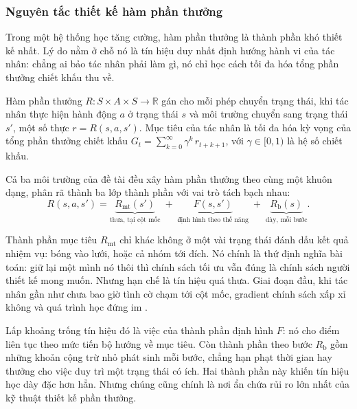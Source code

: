 \subsubsection{Nguyên tắc thiết kế hàm phần thưởng}
\label{sub:reward-principle}
\indent Trong một hệ thống học tăng cường, hàm phần thưởng là thành phần khó thiết kế
nhất. Lý do nằm ở chỗ nó là tín hiệu duy nhất định hướng hành vi của tác nhân: chẳng ai
bảo tác nhân phải làm gì, nó chỉ học cách tối đa hóa tổng phần thưởng chiết khấu thu về.

\begin{dn}
\label{dn:reward}
Hàm phần thưởng $R: S \times A \times S \to \mathbb{R}$ gán cho mỗi phép chuyển trạng
thái, khi tác nhân thực hiện hành động $a$ ở trạng thái $s$ và môi trường chuyển sang
trạng thái $s'$, một số thực $r = R(s, a, s')$. Mục tiêu của tác nhân là tối đa hóa kỳ
vọng của tổng phần thưởng chiết khấu $G_t = \sum_{k=0}^{\infty} \gamma^{k}\, r_{t+k+1}$,
với $\gamma \in [0,1)$ là hệ số chiết khấu.
\end{dn}

\indent Cả ba môi trường của đề tài đều xây hàm phần thưởng theo cùng một khuôn dạng, phân
rã thành ba lớp thành phần với vai trò tách bạch nhau:
\begin{equation}
R(s, a, s') = \underbrace{R_{\mathrm{mt}}(s')}_{\text{thưa, tại cột mốc}}
            \;+\; \underbrace{F(s, s')}_{\text{định hình theo thế năng}}
            \;+\; \underbrace{R_{\mathrm{b}}(s)}_{\text{dày, mỗi bước}} .
\label{eq:reward-decomp}
\end{equation}

\indent Thành phần mục tiêu $R_{\mathrm{mt}}$ chỉ khác không ở một vài trạng thái đánh dấu kết
quả nhiệm vụ: bóng vào lưới, hoặc cả nhóm tới đích. Nó chính là thứ định nghĩa bài
toán: giữ lại một mình nó thôi thì chính sách tối ưu vẫn đúng là chính sách người thiết kế
mong muốn. Nhưng hạn chế là tín hiệu quá thưa. Giai đoạn đầu, khi tác nhân gần như chưa bao giờ
tình cờ chạm tới cột mốc, gradient chính sách xấp xỉ không và quá trình học đứng im
\cite{sutton2018reinforcement}.

\indent Lấp khoảng trống tín hiệu đó là việc của thành phần định hình $F$: nó cho điểm
liên tục theo mức tiến bộ hướng về mục tiêu. Còn thành phần theo bước $R_{\mathrm{b}}$ gồm
những khoản cộng trừ nhỏ phát sinh mỗi bước, chẳng hạn phạt thời gian hay thưởng cho việc
duy trì một trạng thái có ích. Hai thành phần này khiến tín hiệu học dày đặc hơn hẳn.
Nhưng chúng cũng chính là nơi ẩn chứa rủi ro lớn nhất của kỹ thuật thiết kế phần thưởng.

